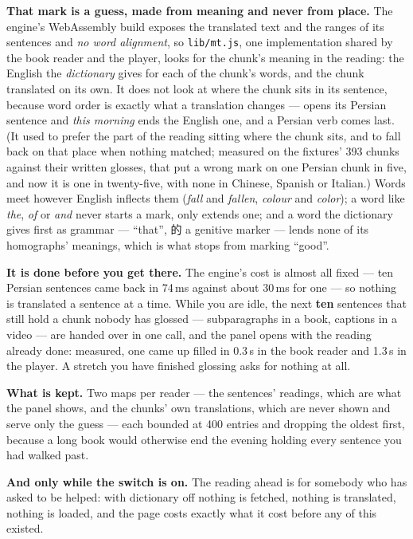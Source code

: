 \documentclass[11pt,oneside]{report}
\newcommand{\pw}[1]{\babelsublr{\mbox{\foreignlanguage{persian}{#1}}}}
\newcommand{\cw}[1]{\mbox{\foreignlanguage{chinese}{#1}}}
\newcommand{\file}[1]{\texttt{#1}}
\newcommand{\menu}[1]{\textsf{#1}}
\begin{document}
\begin{warnbox}
\textbf{That mark is a guess, made from meaning and never from place.} The
engine's WebAssembly build exposes the translated text and the ranges of its
sentences and \emph{no word alignment}, so \file{lib/mt.js}, one
implementation shared by the book reader and the player, looks for the
chunk's meaning in the reading: the English the \emph{dictionary} gives for
each of the chunk's words, and the chunk translated on its own. It does not
look at where the chunk sits in its sentence, because word order is exactly
what a translation changes --- \pw{امروز صبح} opens its Persian sentence and
\emph{this morning} ends the English one, and a Persian verb comes last.
(It used to prefer the part of the reading sitting where the chunk sits,
and to fall back on that place when nothing matched; measured on the
fixtures' 393 chunks against their written glosses, that put a wrong mark on
one Persian chunk in five, and now it is one in twenty-five, with none in
Chinese, Spanish or Italian.) Words meet however English inflects them
(\emph{fall} and \emph{fallen}, \emph{colour} and \emph{color}); a word
like \emph{the}, \emph{of} or \emph{and} never starts a mark, only extends
one; and a word the dictionary gives first as grammar --- \pw{آن} ``that'',
\cw{的} a genitive marker --- lends none of its homographs' meanings, which
is what stops \pw{به} from marking ``good''.
\end{warnbox}

\textbf{It is done before you get there.} The engine's cost is almost all
fixed --- ten Persian sentences came back in 74\,ms against about 30\,ms for
one --- so nothing is translated a sentence at a time. While you are idle,
the next \textbf{ten} sentences that still hold a chunk nobody has glossed
--- subparagraphs in a book, captions in a video --- are handed over in one
call, and the panel opens with the reading already done: measured, one came
up filled in 0.3\,s in the book reader and 1.3\,s in the player. A stretch
you have finished glossing asks for nothing at all.

\textbf{What is kept.} Two maps per reader --- the sentences' readings, which
are what the panel shows, and the chunks' own translations, which are never
shown and serve only the guess --- each bounded at 400 entries and dropping
the oldest first, because a long book would otherwise end the evening holding
every sentence you had walked past.

\textbf{And only while the switch is on.} The reading ahead is for somebody
who has asked to be helped: with \menu{dictionary} off nothing is fetched,
nothing is translated, nothing is loaded, and the page costs exactly what it
cost before any of this existed.
\end{document}
